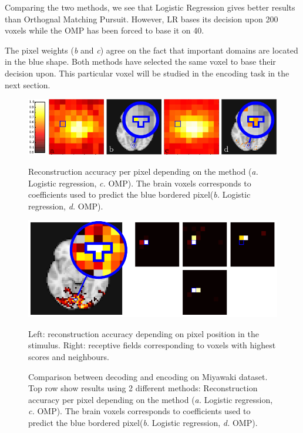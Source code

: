 \documentclass{frontiersSCNS} %
\begin{document}
Comparing the two methods, we see that Logistic Regression gives better results
than Orthognal Matching Pursuit. However, LR bases its decision upon 200 voxels
while the OMP has been forced to base it on 40.

The pixel weights (\textit{b} and \textit{c}) agree on the fact that important
domains are located in the blue shape.
Both methods have selected the same voxel to base their decision upon.
This particular voxel will be studied in the encoding task in the next section.

\begin{figure}[hbtp]
  \begin{center}
    \includegraphics[width=\linewidth]{img/miyawaki/figure_decoding}
  \end{center}
  \caption{Reconstruction accuracy per pixel depending on the method (\textit{a.} Logistic
      regression, \textit{c.} OMP). The brain voxels
  corresponds to coefficients used to predict the blue bordered pixel(\textit{b.} Logistic
      regression, \textit{d.} OMP).}
\label{fig:decoding}
  \begin{center}
    \includegraphics[width=\linewidth]{img/miyawaki/figure_encoding}
  \end{center}
  \caption{Left: reconstruction accuracy depending on pixel
           position in the stimulus. Right: receptive fields corresponding to
       voxels with highest scores and neighbours.}


       \caption{Comparison between decoding and encoding on Miyawaki dataset.
       Top row show results using 2 different methods: Reconstruction accuracy per pixel depending on the method (\textit{a.} Logistic
      regression, \textit{c.} OMP). The brain voxels
  corresponds to coefficients used to predict the blue bordered pixel(\textit{b.} Logistic
      regression, \textit{d.} OMP).}
  \label{fig:encoding}
\end{figure}
\end{document}
